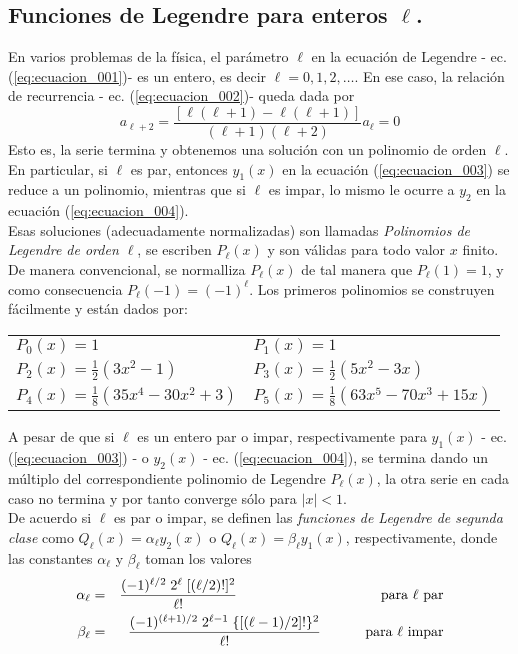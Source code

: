 \subsection{Funciones de Legendre para enteros $\ell$.}
En varios problemas de la física, el parámetro $\ell$ en la ecuación de Legendre - ec. (\ref{eq:ecuacion_001})- es un entero, es decir $\ell = 0,1,2,\ldots$. En ese caso, la relación de recurrencia - ec. (\ref{eq:ecuacion_002})- queda dada por
\[ a_{\ell + 2} = \dfrac{[ \ell (\ell + 1) - \ell (\ell + 1) ]}{(\ell + 1)(\ell + 2)} a_{\ell} = 0 \]
Esto es, la serie termina y obtenemos una solución con un polinomio de orden $\ell$. En particular, si $\ell$ es par, entonces $y_{1}(x)$ en la ecuación (\ref{eq:ecuacion_003}) se reduce a un polinomio, mientras que si $\ell$ es impar, lo mismo le ocurre a $y_{2}$ en la ecuación (\ref{eq:ecuacion_004}).
\\
Esas soluciones (adecuadamente normalizadas) son llamadas \emph{Polinomios de Legendre de orden $\ell$}, se escriben $P_{\ell}(x)$ y son válidas para todo valor $x$ finito. De manera convencional, se normalliza $P_{\ell}(x)$ de tal manera que $P_{\ell}(1) =  1$, y como consecuencia $P_{\ell}(-1) = (-1)^{\ell}$. Los primeros polinomios se construyen fácilmente y están dados por:
\begin{center}
\begin{tabular}{l l}
$P_{0}(x) = 1 $ & $P_{1}(x) = 1 $ \\
$P_{2}(x) = \frac{1}{2} (3 x^{2} - 1)$ & $P_{3}(x) = \frac{1}{2} (5 x^{2} - 3 x)$ \\ 
$P_{4}(x) = \frac{1}{8} (35 x^{4} - 30 x^{2} + 3)$ & $P_{5}(x) = \frac{1}{8} (63 x^{5} - 70 x^{3} + 15 x)$
\end{tabular}
\end{center}
A pesar de que si $\ell$ es un entero par o impar, respectivamente para $y_{1}(x)$ - ec. (\ref{eq:ecuacion_003}) - o $y_{2}(x)$ - ec. (\ref{eq:ecuacion_004}), se termina dando un múltiplo del correspondiente polinomio de Legendre $P_{\ell}(x)$, la otra serie en cada caso no termina y por tanto converge sólo para $\vert x \vert < 1$.
\\
De acuerdo si $\ell$ es par o impar, se definen las \emph{funciones de Legendre de segunda clase} como $Q_{\ell}(x) =  \alpha_{\ell} y_{2}(x)$ o $Q_{\ell}(x) =  \beta_{\ell} y_{1}(x)$, respectivamente, donde las constantes $\alpha_{\ell}$ y $\beta_{\ell}$ toman los valores
\begin{eqnarray}
\alpha_{\ell} &=& \dfrac{(-1)^{\ell/2} \; 2^{\ell} \; [(\ell / 2)!]^{2}}{\ell!} \hspace{3.5cm} \mbox{ para $\ell$ par} \label{eq:ecuacion_005}\\
\beta_{\ell} &=& \dfrac{(-1)^{(\ell + 1)/2} \; 2^{\ell - 1} \; \lbrace \left[ (\ell - 1) /2 \right] ! \rbrace^{2}}{\ell!} \hspace{1cm} \mbox{ para $\ell$ impar} \label{eq:ecuacion_006}
\end{eqnarray}
